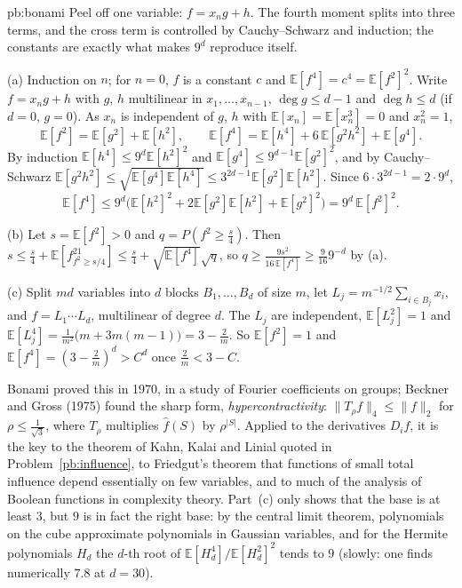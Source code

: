 \begin{solution}{pb:bonami}
\idea Peel off one variable: $f=x_ng+h$. The fourth moment splits into three terms, and the cross term is controlled by Cauchy--Schwarz
and induction; the constants are exactly what makes $9^d$ reproduce itself.

\writeup (a) Induction on $n$; for $n=0$, $f$ is a constant $c$ and $\mathbb E[f^4]=c^4=\mathbb E[f^2]^2$. Write $f=x_ng+h$ with $g$, $h$ multilinear in $x_1,\dots,x_{n-1}$,
$\deg g\le d-1$ and $\deg h\le d$ (if $d=0$, $g=0$). As $x_n$ is independent of $g$, $h$ with $\mathbb E[x_n]=\mathbb E[x_n^3]=0$ and $x_n^2=1$,
\[
\mathbb E[f^2]=\mathbb E[g^2]+\mathbb E[h^2],\qquad\mathbb E[f^4]=\mathbb E[h^4]+6\,\mathbb E[g^2h^2]+\mathbb E[g^4].
\]
By induction $\mathbb E[h^4]\le9^d\mathbb E[h^2]^2$ and $\mathbb E[g^4]\le9^{d-1}\mathbb E[g^2]^2$, and by Cauchy--Schwarz $\mathbb E[g^2h^2]\le\sqrt{\mathbb E[g^4]\mathbb E[h^4]}\le3^{2d-1}\mathbb E[g^2]\mathbb E[h^2]$.
Since $6\cdot3^{2d-1}=2\cdot9^d$,
\[
\mathbb E[f^4]\le9^d\bigl(\mathbb E[h^2]^2+2\mathbb E[g^2]\mathbb E[h^2]+\mathbb E[g^2]^2\bigr)=9^d\,\mathbb E[f^2]^2.
\]

(b) Let $s=\mathbb E[f^2]>0$ and $q=P(f^2\ge\frac s4)$. Then $s\le\frac s4+\mathbb E[f^21_{f^2\ge s/4}]\le\frac s4+\sqrt{\mathbb E[f^4]}\sqrt q$, so
$q\ge\frac{9s^2}{16\,\mathbb E[f^4]}\ge\frac9{16}9^{-d}$ by (a).

(c) Split $md$ variables into $d$ blocks $B_1,\dots,B_d$ of size $m$, let $L_j=m^{-1/2}\sum_{i\in B_j}x_i$, and $f=L_1\cdots L_d$, multilinear of degree $d$. The
$L_j$ are independent, $\mathbb E[L_j^2]=1$ and $\mathbb E[L_j^4]=\frac1{m^2}\bigl(m+3m(m-1)\bigr)=3-\frac2m$. So $\mathbb E[f^2]=1$ and $\mathbb E[f^4]=(3-\frac2m)^d>C^d$ once $\frac2m<3-C$.

\leads Bonami proved this in 1970, in a study of Fourier coefficients on groups; Beckner and Gross (1975) found the sharp form,
\emph{hypercontractivity}: $\|T_\rho f\|_4\le\|f\|_2$ for $\rho\le\frac1{\sqrt3}$, where $T_\rho$ multiplies $\hat f(S)$ by $\rho^{|S|}$. Applied to the derivatives
$D_if$, it is the key to the theorem of Kahn, Kalai and Linial quoted in Problem~\ref{pb:influence}, to Friedgut's theorem that functions
of small total influence depend essentially on few variables, and to much of the analysis of Boolean functions in complexity
theory. Part~(c) only shows that the base is at least $3$, but $9$ is in fact the right base: by the central limit theorem, polynomials on
the cube approximate polynomials in Gaussian variables, and for the Hermite polynomials $H_d$ the $d$-th root of
$\mathbb E[H_d^4]/\mathbb E[H_d^2]^2$ tends to $9$ (slowly: one finds numerically $7.8$ at $d=30$).
\end{solution}

